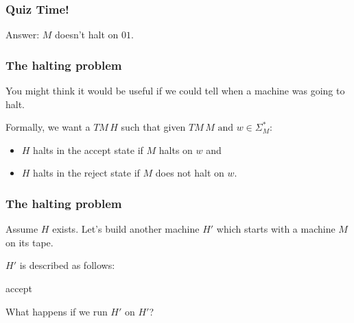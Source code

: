 \documentclass[aspectratio=169]{beamer}
\begin{document}
\begin{frame}[noframenumbering]
\frametitle{Quiz Time!}

\begin{center}
\end{center}

Answer: $M$ doesn't halt on $01$.
\end{frame}

\begin{frame}
\frametitle{The halting problem}
You might think it would be useful if we could tell when a machine was going to halt.

Formally, we want a $TM\, H$ such that given $TM\, M \text{ and } w \in \Sigma_M^*$:

\begin{itemize}
    \item $H$ halts in the accept state if $M$ halts on $w$ and
    \item $H$ halts in the reject state if $M$ does not halt on $w$.
\end{itemize}

\end{frame}

\begin{frame}
\frametitle{The halting problem}

Assume $H$ exists. Let's build another machine $H'$ which starts with a machine $M$ on its tape.

$H'$ is described as follows:
\begin{algorithm}[H]
{accept}
\end{algorithm}

What happens if we run $H'$ on $H'$?

\end{frame}
\end{document}

